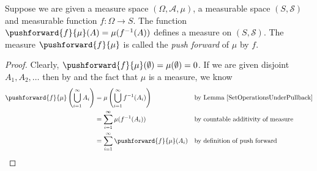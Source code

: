 \begin{lem}\label{PushforwardMeasure}Suppose we are given a measure space $(\Omega, \mathcal{A},
  \mu)$, a measurable space $(S, \mathcal{S})$ and measurable
  function $f : \Omega \to S$.  The function $\pushforward{f}{\mu} (A) =
  \mu(f^{-1}(A))$ defines a measure on $(S, \mathcal{S})$.  The
  measure $\pushforward{f}{\mu}$ is called the \emph{push forward} of
  $\mu$ by $f$.
\end{lem}
\begin{proof}Clearly, $\pushforward{f}{\mu} (\emptyset) = \mu(\emptyset) =
  0$.  
If we are given disjoint $A_1, A_2, \dots$ then by and the fact that $\mu$ is a measure,
we know 
\begin{align*}
\pushforward{f}{\mu} \left (\bigcup_{i=1}^\infty A_i \right ) & =
\mu \left (\bigcup_{i=1}^\infty f^{-1}(A_i) \right ) & & \text{by Lemma
\ref{SetOperationsUnderPullback}} \\
& = \sum_{i=1}^\infty \mu (f^{-1}(A_i)) & & \text{by countable
  additivity of measure}\\
&=  \sum_{i=1}^\infty \pushforward{f}{\mu} (A_i) & & \text{by
  definition of push forward}
\end{align*}
\end{proof}

